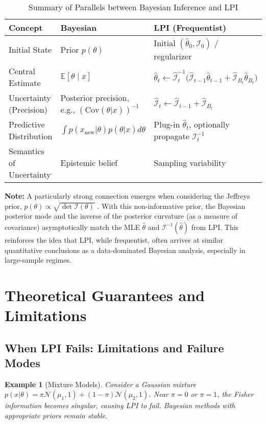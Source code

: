 \documentclass[11pt]{article}
\newtheorem{example}[theorem]{Example}
\begin{document}
\begin{table}[h!]
\centering
\begin{tabular}{l m{4.2cm} m{5.8cm}} 
\toprule
Concept & Bayesian & LPI (Frequentist) \\
\midrule
Initial State & Prior $p(\theta)$ & Initial $(\hat\theta_0, \mathcal{I}_0)$ / regularizer \\
Central Estimate & $\mathbb E[\theta\mid x]$ & $\hat\theta_{t} \leftarrow \hat{\mathcal I}_{t}^{-1}\bigl(\hat{\mathcal I}_{t-1}\hat\theta_{t-1} + \hat{\mathcal I}_{B_t}\hat\theta_{B_t}\bigr)$ \\
Uncertainty (Precision) & Posterior precision, e.g., $(\text{Cov}(\theta|x))^{-1}$ & $\hat{\mathcal I}_{t} \leftarrow \hat{\mathcal I}_{t-1} + \hat{\mathcal I}_{B_t}$ \\
Predictive Distribution & $\int p(x_{\text{new}}|\theta)p(\theta|x)d\theta$ & Plug-in $\hat\theta_t$, optionally propagate $\mathcal{I}_t^{-1}$ \\
Semantics of Uncertainty & Epistemic belief & Sampling variability \\
\bottomrule
\end{tabular}
\caption{Summary of Parallels between Bayesian Inference and LPI}
\label{tab:bayes_lpi_parallels}
\end{table}

\textbf{Note:} A particularly strong connection emerges when considering the Jeffreys prior, $p(\theta)\propto\sqrt{\det\mathcal I(\theta)}$ \cite{jeffreys1939theory, robert2007bayesian}. With this non-informative prior, the Bayesian posterior mode and the inverse of the posterior curvature (as a measure of covariance) asymptotically match the MLE $\hat{\theta}$ and $\mathcal{I}^{-1}(\hat{\theta})$ from LPI. This reinforces the idea that LPI, while frequentist, often arrives at similar quantitative conclusions as a data-dominated Bayesian analysis, especially in large-sample regimes.

\section{Theoretical Guarantees and Limitations}

\subsection{When LPI Fails: Limitations and Failure Modes}

\begin{example}[Mixture Models]
Consider a Gaussian mixture $p(x|\theta) = \pi \mathcal{N}(\mu_1, 1) + (1-\pi)\mathcal{N}(\mu_2, 1)$. Near $\pi = 0$ or $\pi = 1$, the Fisher information becomes singular, causing LPI to fail. Bayesian methods with appropriate priors remain stable.
\end{example}
\end{document}
